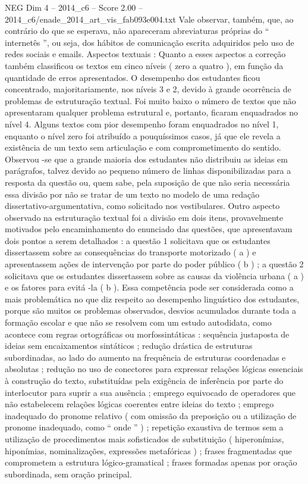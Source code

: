 \begin{textsample}{NEG Dim 4 – 2014\_c6 – Score 2.00 – 2014\_c6/enade\_2014\_art\_vis\_fab093e004.txt}
Vale observar, também, que, ao contrário do que se esperava, não apareceram abreviaturas próprias do “ internetês ”, ou seja, dos hábitos de comunicação escrita adquiridos pelo uso de redes sociais e emails.
Aspectos textuais : Quanto a esses aspectos a correção também classificou os textos em cinco níveis ( zero a quatro ), em função da quantidade de erros apresentados.
O desempenho dos estudantes ficou concentrado, majoritariamente, nos níveis 3 e 2, devido à grande ocorrência de problemas de estruturação textual.
Foi muito baixo o número de textos que não apresentaram qualquer problema estrutural e, portanto, ficaram enquadrados no nível 4.
Alguns textos com pior desempenho foram enquadrados no nível 1, enquanto o nível zero foi atribuído a pouquíssimos casos, já que ele revela a existência de um texto sem articulação e com comprometimento do sentido.
Observou -se que a grande maioria dos estudantes não distribuiu as ideias em parágrafos, talvez devido ao pequeno número de linhas disponibilizadas para a resposta da questão ou, quem sabe, pela suposição de que não seria necessária essa divisão por não se tratar de um texto no modelo de uma redação dissertativo-argumentativa, como solicitado nos vestibulares.
Outro aspecto observado na estruturação textual foi a divisão em dois itens, provavelmente motivados pelo encaminhamento do enunciado das questões, que apresentavam dois pontos a serem detalhados : a questão 1 solicitava que os estudantes dissertassem sobre as consequências do transporte motorizado ( a ) e apresentassem ações de intervenção por parte do poder público ( b ) ; a questão 2 solicitava que os estudantes dissertassem sobre as causas da violência urbana ( a ) e os fatores para evitá -la ( b ).
Essa competência pode ser considerada como a mais problemática no que diz respeito ao desempenho linguístico dos estudantes, porque são muitos os problemas observados, desvios acumulados durante toda a formação escolar e que não se resolvem com um estudo autodidata, como acontece com regras ortográficas ou morfossintáticas : sequência justaposta de ideias sem encaixamentos sintáticos ; redução drástica de estruturas subordinadas, ao lado do aumento na frequência de estruturas coordenadas e absolutas ; redução no uso de conectores para expressar relações lógicas essenciais à construção do texto, substituídas pela exigência de inferência por parte do interlocutor para suprir a sua ausência ; emprego equivocado de operadores que não estabelecem relações lógicas coerentes entre ideias do texto ; emprego inadequado do pronome relativo ( com omissão da preposição ou a utilização de pronome inadequado, como “ onde ” ) ; repetição exaustiva de termos sem a utilização de procedimentos mais sofisticados de substituição ( hiperonímias, hiponímias, nominalizações, expressões metafóricas ) ; frases fragmentadas que comprometem a estrutura lógico-gramatical ; frases formadas apenas por oração subordinada, sem oração principal.

\end{textsample}

